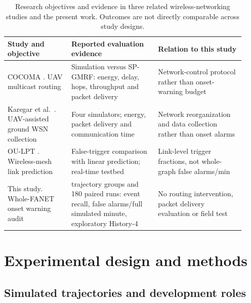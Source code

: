 \documentclass[10pt,a4paper]{article}
\begin{document}
\begin{table}[htbp]
\caption{Research objectives and evidence in three related wireless-networking studies and the present work. Outcomes are not directly comparable across study designs.}\label{tab:journal_comparison}
\centering
\small
\setlength{\tabcolsep}{2.5pt}
\renewcommand{\arraystretch}{1.13}
\begin{tabular}{@{}>{\raggedright\arraybackslash}p{0.25\linewidth}>{\raggedright\arraybackslash}p{0.34\linewidth}>{\raggedright\arraybackslash}p{0.34\linewidth}@{}}
\toprule
Study and objective & Reported evaluation evidence & Relation to this study \\
\midrule
COCOMA \cite{cocoma2024}. UAV multicast routing & Simulation versus SP-GMRF: energy, delay, hops, throughput and packet delivery & Network-control protocol rather than onset-warning budget \\
\addlinespace[3pt]
Karegar et al.\ \cite{karegar2025uav}. UAV-assisted ground WSN collection & Four simulators; energy, packet delivery and communication time & Network reorganization and data collection rather than onset alarms \\
\addlinespace[3pt]
OU-LPT \cite{chin2014oulpt}. Wireless-mesh link prediction & False-trigger comparison with linear prediction; real-time testbed & Link-level trigger fractions, not whole-graph false alarms/min \\
\addlinespace[3pt]
This study. Whole-FANET onset warning audit & 45 trajectory groups and 180 paired runs: event recall, false alarms/full simulated minute, exploratory History-4 & No routing intervention, packet delivery evaluation or field test \\
\bottomrule
\end{tabular}
\end{table}

\section{Experimental design and methods}\label{sec:methods}

\subsection{Simulated trajectories and development roles}
\end{document}
